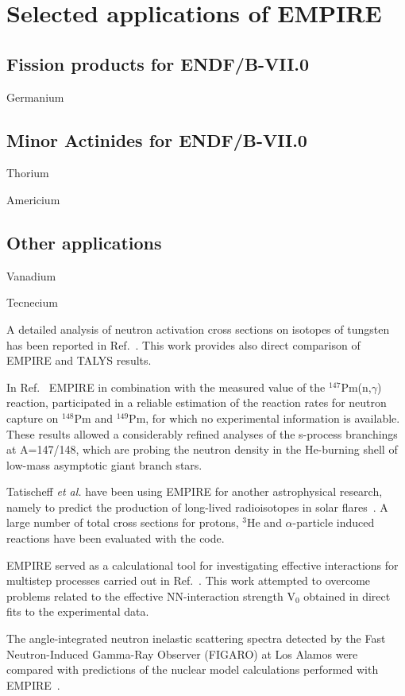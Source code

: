 \documentclass[twocolumn,amsmath,amssymb,10pt,groupedaddress,a4paper]{revtex4}
\begin{document}
\section{Selected applications of EMPIRE}
\subsection{Fission products for ENDF/B-VII.0}
Germanium~\cite{iwamoto2005ncs}
\subsection{Minor Actinides for ENDF/B-VII.0}
Thorium~\cite{Sin:06}

Americium~\cite{Rochman:06a}
\subsection{Other applications}
Vanadium~\cite{Rochman:06b}

Tecnecium~\cite{Rochman:07c}

A detailed analysis of neutron activation cross sections on isotopes of tungsten has been reported in Ref.~\cite{Avrigeanu:06}. This work provides also direct comparison of EMPIRE and TALYS results.

In Ref.~\cite{reifarth2003snc} EMPIRE in combination
with the measured value of the $^{147}$Pm(n,$\gamma$) reaction, participated in a
reliable estimation of the reaction rates for neutron capture on $^{148}$Pm and $^{149}$Pm, for which no experimental information is available. These results allowed
a considerably refined analyses of the s-process branchings at A=147/148, which are probing the neutron density in the He-burning shell of low-mass asymptotic giant branch stars.

Tatischeff \textit{et al.} have been using EMPIRE for another astrophysical research, namely to predict the production of long-lived radioisotopes in solar flares~\cite{Tatischeff:06}. A large number of total cross sections for protons, $^3$He and $\alpha$-particle induced reactions have been evaluated with the code.

EMPIRE served as a calculational tool for investigating effective interactions for multistep processes carried out in Ref.~\cite{avrigeanu2001eim}. This work attempted to overcome problems related to the effective NN-interaction strength V$_0$ obtained in direct fits to the experimental data.


The angle-integrated neutron inelastic scattering spectra detected by the Fast Neutron-Induced Gamma-Ray Observer (FIGARO) at Los Alamos were compared with predictions of the nuclear model calculations performed with EMPIRE~\cite{rochman2004nir}.
\end{document}
